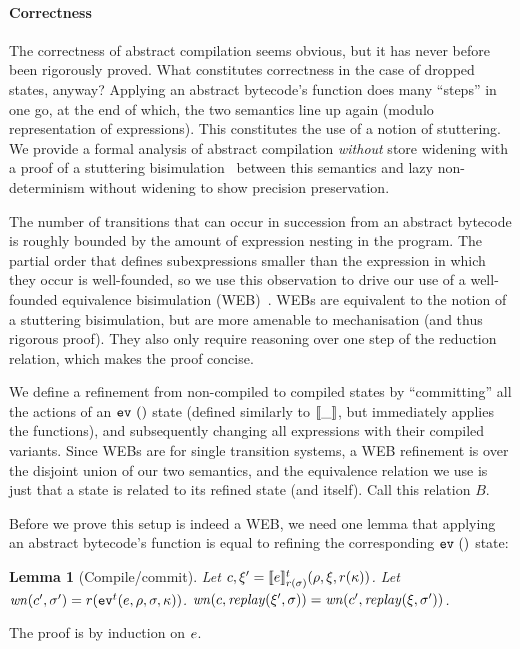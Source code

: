 \documentclass[preprint,onecolumn,9pt]{sigplanconf} %
\newtheorem{lemma}{Lemma}
\begin{document}
\paragraph{Correctness}
The correctness of abstract compilation seems obvious, but it has
never before been rigorously proved. What constitutes correctness in
the case of dropped states, anyway? Applying an abstract bytecode's
function does many ``steps'' in one go, at the end of which, the two
semantics line up again (modulo representation of expressions). This
constitutes the use of a notion of stuttering. We provide a formal
analysis of abstract compilation \emph{without} store widening with a proof
of a stuttering bisimulation~\cite{ianjohnson:BCG88} between this
semantics and lazy non-determinism without widening to show precision
preservation. %

The number of transitions that can occur in succession from an
abstract bytecode is roughly bounded by the amount of expression
nesting in the program. The partial order that defines subexpressions
smaller than the expression in which they occur is well-founded, so we
use this observation to drive our use of a well-founded equivalence
bisimulation (WEB)~\cite{ianjohnson:manolios-diss}. WEBs are equivalent to the notion of a stuttering
bisimulation, but are more amenable to mechanisation (and thus
rigorous proof). They also only require reasoning over one step of the
reduction relation, which makes the proof concise.

We define a refinement from non-compiled to compiled states by
``committing'' all the actions of an $\ev{}$ state (defined similarly to
$\compile{\_}$, but immediately applies the functions), and
subsequently changing all expressions with their compiled
variants. Since WEBs are for single transition systems, a WEB
refinement is over the disjoint union of our two semantics, and the
equivalence relation we use is just that a state is related to its
refined state (and itself). Call this relation $B$.

Before we prove this setup is indeed a WEB, we need one lemma that
applying an abstract bytecode's function is equal to refining the
corresponding $\ev{}$ state:
%
\begin{lemma}[Compile/commit]
Let $c,\msdiff' = \compile{\mexp}^\mcntr_{r(\msto)}(\menv,\msdiff,r(\mkont))$.
Let $\wn(c',\msto') = r(\ev[^\mcntr]{\mexp,\menv,\msto,\mkont})$.
$\wn(c,\replay(\msdiff',\msto)) = \wn(c',\replay(\msdiff,\msto'))$.
\end{lemma}
The proof is by induction on $\mexp$.
\end{document}
